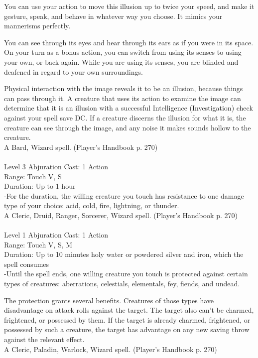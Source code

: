 \documentclass[10pt,twocolumn]{report}
\begin{document}
You can use your action to move this illusion up to twice your speed, and make it gesture, speak, and behave in whatever way you choose. It mimics your mannerisms perfectly.

You can see through its eyes and hear through its ears as if you were in its space. On your turn as a bonus action, you can switch from using its senses to using your own, or back again. While you are using its senses, you are blinded and deafened in regard to your own surroundings.

Physical interaction with the image reveals it to be an illusion, because things can pass through it. A creature that uses its action to examine the image can determine that it is an illusion with a successful Intelligence (Investigation) check against your spell save DC. If a creature discerns the illusion for what it is, the creature can see through the image, and any noise it makes sounds hollow to the creature.\\
A Bard, Wizard spell. (Player's Handbook p. 270) \\


 \\
Level 3 \quad Abjuration \quad Cast: 1 Action\\
Range: Touch \quad V, S\\
Duration: Up to 1 hour \quad \\
-For the duration, the willing creature you touch has resistance to one damage type of your choice: acid, cold, fire, lightning, or thunder.\\
A Cleric, Druid, Ranger, Sorcerer, Wizard spell. (Player's Handbook p. 270) \\


 \\
Level 1 \quad Abjuration \quad Cast: 1 Action\\
Range: Touch \quad V, S, M\\
Duration: Up to 10 minutes \quad holy water or powdered silver and iron, which the spell consumes\\
-Until the spell ends, one willing creature you touch is protected against certain types of creatures: aberrations, celestials, elementals, fey, fiends, and undead.

The protection grants several benefits. Creatures of those types have disadvantage on attack rolls against the target. The target also can’t be charmed, frightened, or possessed by them. If the target is already charmed, frightened, or possessed by such a creature, the target has advantage on any new saving throw against the relevant effect.\\
A Cleric, Paladin, Warlock, Wizard spell. (Player's Handbook p. 270) \\
\end{document}
